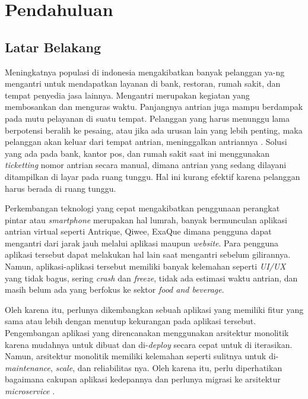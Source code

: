 \chapter{Pendahuluan}

\section{Latar Belakang}
Meningkatnya populasi di indonesia mengakibatkan banyak pelanggan ya-ng mengantri untuk mendapatkan layanan di bank, restoran, rumah sakit, dan tempat penyedia jasa lainnya. Mengantri merupakan kegiatan yang membosankan dan menguras waktu. Panjangnya antrian juga mampu berdampak pada mutu pelayanan di suatu tempat. Pelanggan yang harus menunggu lama berpotensi beralih ke pesaing, atau jika ada urusan lain yang lebih penting, maka pelanggan akan keluar dari tempat antrian, meninggalkan antriannya \cite{khong2017queue}\cite{Ghazal2016}\cite{Uddin2016}. Solusi yang ada pada bank, kantor pos, dan rumah sakit saat ini menggunakan \textit{ticketting} nomor antrian secara manual, dimana antrian yang sedang dilayani ditampilkan di layar pada ruang tunggu. Hal ini kurang efektif karena pelanggan harus berada di ruang tunggu\cite{Ghazal2016}.

Perkembangan teknologi yang cepat mengakibatkan penggunaan perangkat pintar atau \textit{smartphone} merupakan hal lumrah, banyak bermunculan aplikasi antrian virtual seperti Antrique, Qiwee, ExaQue dimana pengguna dapat mengantri dari jarak jauh melalui aplikasi maupun \textit{website}. Para pengguna aplikasi tersebut dapat melakukan hal lain saat mengantri sebelum gilirannya. Namun, aplikasi-aplikasi tersebut memiliki banyak kelemahan seperti \textit{UI/UX} yang tidak bagus, sering \textit{crash} dan \textit{freeze}, tidak ada estimasi waktu antrian, dan masih belum ada yang berfokus ke sektor \textit{food and beverage}.

Oleh karena itu, perlunya dikembangkan sebuah aplikasi yang memiliki fitur yang sama atau lebih dengan menutup kekurangan pada aplikasi tersebut. Pengembangan aplikasi yang direncanakan menggunakan arsitektur monolitik karena mudahnya untuk dibuat dan di-\textit{deploy} secara cepat untuk di iterasikan. Namun, arsitektur monolitik memiliki kelemahan seperti sulitnya untuk di-\textit{maintenance}, \textit{scale}, dan reliabilitas nya. Oleh karena itu, perlu diperhatikan bagaimana cakupan aplikasi kedepannya dan perlunya migrasi ke arsitektur \textit{microservice} \cite{gos2020comparison} \cite{jatkiewicz2023differences}.

